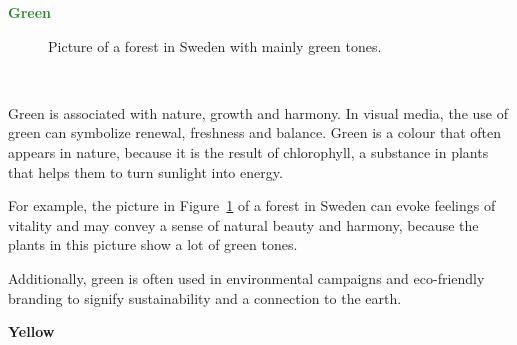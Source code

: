 \documentclass[../MasterThesis.tex]{subfiles}
\begin{document}
\textbf{\textcolor{ForestGreen}{Green}}

%
%
\begin{minipage}{0.5\textwidth}
	\begin{figure}[H]
		\begin{center}
			\caption[Picture of a forest in Sweden with mainly green tones.]{Picture of a forest in Sweden with mainly green tones.}
			\label{figure:green}
		\end{center}
	\end{figure}\hfill
\end{minipage}\begin{minipage}{0.05\textwidth}
	\ 
\end{minipage}\begin{minipage}{0.45\textwidth}
	Green is associated with nature, growth and harmony. In visual media, the use of green can symbolize renewal, freshness and balance. Green is a colour that often appears in nature, because it is the result of chlorophyll, a substance in plants that helps them to turn sunlight into energy.~\cite{green, colour2}
	
	For example, the picture in Figure~\ref{figure:green} of a forest in Sweden can evoke feelings of vitality  and  may convey a sense of natural beauty and harmony, because the plants in this picture show a lot of green tones.~\cite{greenwashing}
	

	
	
\end{minipage}

	\vspace*{-0.6em}

	Additionally, green is often used in environmental campaigns and eco-friendly branding to signify sustainability and a connection to the earth. 








\newpage
\textbf{\textcolor{YellowOrange}{Yellow}}
\end{document}
